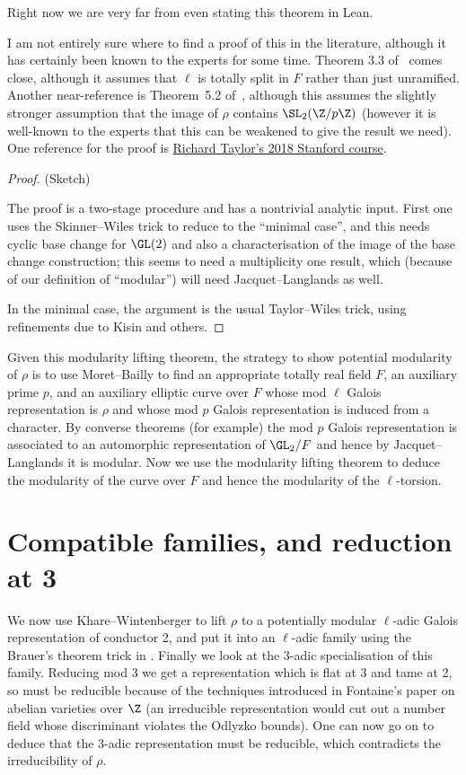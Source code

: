 Right now we are very far from even stating this theorem in Lean.

I am not entirely sure where to find a proof of this in the literature, although it has certainly been known to the experts for some time. Theorem 3.3 of~\cite{taylor-mero-cont} comes close, although it assumes that $\ell$ is totally split in $F$ rather than just unramified. Another near-reference is Theorem~5.2 of~\cite{toby-modularity}, although this assumes
the slightly stronger assumption that the image of $\rho$ contains $\SL_2(\Z/p\Z)$ (however it is well-known to the experts that this can be weakened to give the result we need). One reference for the proof is \href{https://math.berkeley.edu/~fengt/249A_2018.pdf}{Richard Taylor's 2018 Stanford course}.

\begin{proof} (Sketch)

The proof is a two-stage procedure and has a nontrivial analytic input. First one uses the Skinner--Wiles trick to reduce to the ``minimal case'', and this needs cyclic base change for $\GL(2)$ and also a characterisation
of the image of the base change construction; this seems to need a multiplicity one result, which (because of our
definition of ``modular'') will need Jacquet--Langlands as well.

In the minimal case, the argument is the usual Taylor--Wiles trick, using refinements due to Kisin and others.
\end{proof}

Given this modularity lifting theorem, the strategy to show potential modularity of $\rho$ is to use Moret--Bailly to find an appropriate totally real field $F$, an auxiliary prime $p$, and an auxiliary elliptic curve over $F$ whose mod $\ell$ Galois representation is $\rho$ and whose
mod $p$ Galois representation is induced from a character. By converse theorems (for example)
the mod $p$ Galois representation is associated to an automorphic representation of
$\GL_2/F$ and hence by Jacquet--Langlands it is modular. Now we use the
modularity lifting theorem to deduce the modularity of the curve over $F$ and hence
the modularity of the $\ell$-torsion.

\section{Compatible families, and reduction at 3}

We now use Khare--Wintenberger to lift $\rho$ to a potentially modular $\ell$-adic
Galois representation of conductor 2, and put it into an $\ell$-adic family using
the Brauer's theorem trick in \cite{blggt}. Finally we look at the 3-adic specialisation
of this family. Reducing mod 3 we get a representation which is flat at 3 and tame at 2,
so must be reducible because
of the techniques introduced in Fontaine's paper on abelian varieties over $\Z$ (an irreducible
representation would cut out a number field whose discriminant violates the Odlyzko bounds).
One can now go on to deduce that the 3-adic representation must be reducible, which
contradicts the irreducibility of $\rho$.

